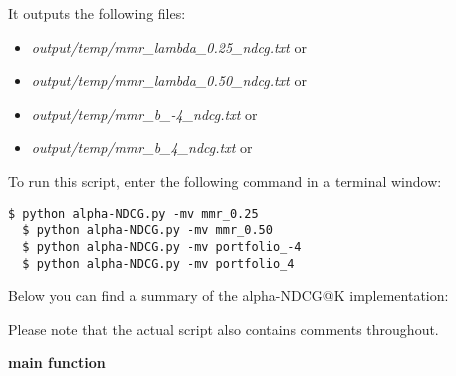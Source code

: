 \documentclass{article} %
\begin{document}
It outputs the following files:

\begin{itemize}
    \item \textit{output/temp/mmr\_lambda\_0.25\_ndcg.txt} or
    \item \textit{output/temp/mmr\_lambda\_0.50\_ndcg.txt} or
    \item \textit{output/temp/mmr\_b\_-4\_ndcg.txt} or
    \item \textit{output/temp/mmr\_b\_4\_ndcg.txt} or
\end{itemize}

To run this script, enter the following command in a terminal window:

\begin{lstlisting}[style=Bash]
  $ python alpha-NDCG.py -mv mmr_0.25
  $ python alpha-NDCG.py -mv mmr_0.50
  $ python alpha-NDCG.py -mv portfolio_-4
  $ python alpha-NDCG.py -mv portfolio_4
\end{lstlisting}

Below you can find a summary of the alpha-NDCG@K implementation:

Please note that the actual script also contains comments throughout.

\textbf{main function}
\end{document}
